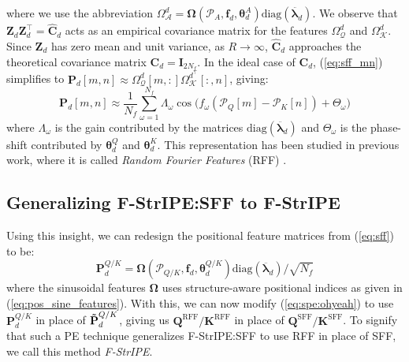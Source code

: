 where we use the abbreviation $\Omega_\mathcal{A}^d = \boldsymbol{\Omega}\left(\mathcal{P}_A, \boldsymbol{f}_d, \boldsymbol{\theta}_d^A \right) \text{diag}\left(\ddot{\boldsymbol{\lambda}_d}\right)$. We observe that $\mathbf{Z}_d \mathbf{Z}_d^\top = \widehat{\mathbf{C}}_d$ acts as an empirical covariance matrix for the features $\Omega_\mathcal{Q}^d$ and $\Omega_\mathcal{K}^d$. Since $\mathbf{Z}_d$ has zero mean and unit variance, as $R \to \infty$, $\widehat{\mathbf{C}}_d$ approaches the theoretical covariance matrix $\mathbf{C}_d = \mathbf{I}_{2N_{f}}$.
In the ideal case of $\mathbf{C}_d$, (\ref{eq:sff_mn}) simplifies to $\mathbf{P}_d[m, n] \approx \Omega_\mathcal{Q}^d [m, :] \Omega_\mathcal{K}^{d^\top} [:, n]$, giving:
\begin{equation} \label{eq:ideal_C}
    \mathbf{P}_d[m, n] \approx  \frac{1}{N_f}  \sum_{\omega = 1}^{N_f} \Lambda_\omega \cos \Big( f_{\omega} ( \mathcal{P}_Q[m] - \mathcal{P}_K[n] ) + \Theta_\omega \Big)
\end{equation}
where $\Lambda_\omega$ is the gain contributed by the matrices $\text{diag}\left(\ddot{\boldsymbol{\lambda}_d}\right)$ and $\Theta_\omega$ is the phase-shift contributed by $\boldsymbol{\theta}^Q_d$ and $\boldsymbol{\theta}^K_d$. This representation has been studied in previous work, where it is called \textit{Random Fourier Features} (RFF) \cite{rahimi_random_2007, sutherland_error_2015}.

\subsection{Generalizing F-StrIPE:SFF to F-StrIPE}

Using this insight, we can redesign the positional feature matrices from (\ref{eq:sff}) to be:
\begin{equation} \label{eq:rff}
    \mathbf{P}^{Q/K}_d = \boldsymbol{\Omega}\left(\mathcal{P}_{Q/K}, \boldsymbol{f}_d, \boldsymbol{\theta}_d^{Q/K}\right) \text{diag}\left(\ddot{\boldsymbol{\lambda}_d}\right) / \sqrt{N_f}
\end{equation}
where the sinusoidal features $\boldsymbol{\Omega}$ uses structure-aware positional indices as given in (\ref{eq:pos_sine_features}). With this, we can now modify (\ref{eq:spe:ohyeah}) to use $\mathbf{P}^{Q/K}_d$ in place of $\mathbf{\tilde{\text{$\mathbf{P}$}}}^{Q/K}_d$, giving us $\mathbf{Q}^{\text{RFF}}/\mathbf{K}^{\text{RFF}}$ in place of $\mathbf{Q}^{\text{SFF}}/\mathbf{K}^{\text{SFF}}$. To signify that such a PE technique generalizes F-StrIPE:SFF to use RFF in place of SFF, we call this method \textit{F-StrIPE}.

